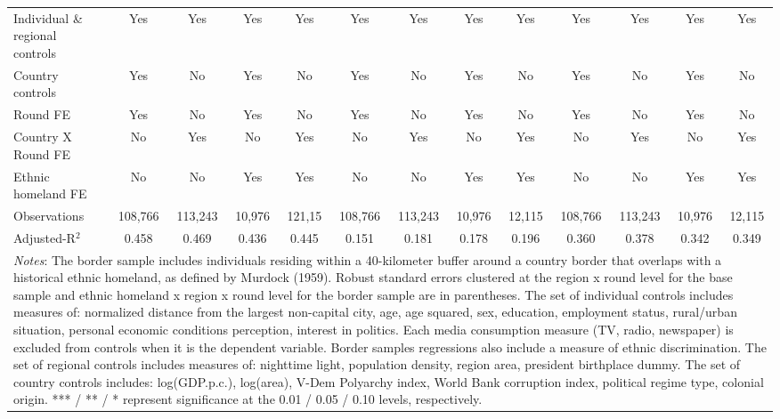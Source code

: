 \documentclass[11pt]{article}
\theoremstyle{plain}
\theoremstyle{plain}
\begin{document}
\begin{table}[H]
{\begin{tabular}{@{\extracolsep{5pt}} l c c c c c c c c c c c c}
        \midrule
             \smallskip
            Individual \& regional controls  & Yes & Yes & Yes & Yes  & Yes & Yes & Yes & Yes & Yes & Yes & Yes & Yes \\
            \smallskip
            Country controls & Yes& No& Yes& No& Yes& No& Yes& No& Yes& No& Yes& No\\
            \smallskip
            Round FE & Yes & No& Yes & No & Yes & No& Yes & No & Yes & No& Yes & No\\
            \smallskip
            Country X Round FE       & No & Yes& No & Yes& No & Yes& No & Yes& No & Yes& No & Yes\\
            \smallskip
            Ethnic homeland FE & No & No & Yes& Yes& No & No & Yes& Yes& No & No & Yes& Yes\\
            \smallskip
            Observations            &      108,766   &      113,243   &       10,976   &       121,15  &  108,766   &      113,243   &       10,976   &       12,115  &      108,766   &      113,243   &       10,976   &       12,115\\
            Adjusted-R$^2$         &   0.458   &       0.469   &       0.436   &       0.445 &       0.151   &       0.181   &       0.178   &       0.196 &       0.360   &       0.378   &       0.342   &       0.349  \\
                                  \bottomrule
            \multicolumn{13}{p{29cm}}{\footnotesize \emph{Notes}: The border sample includes individuals residing within a 40-kilometer buffer around a country border that overlaps with a historical ethnic homeland, as defined by Murdock (1959). Robust standard errors clustered at the region x round level  for the base sample and ethnic homeland x region x round level for the border sample are in parentheses. The set of individual controls
            includes measures of: normalized distance from the largest non-capital city, age, age squared, sex,
            education, employment status, rural/urban situation, personal economic conditions perception, interest in politics. Each media consumption measure (TV, radio, newspaper) is excluded from controls when it is the dependent variable. Border samples regressions also include a measure of ethnic discrimination. The set of regional controls includes measures of: nighttime light, population density, region area, president birthplace dummy. The set of country controls includes: log(GDP.p.c.), log(area), V-Dem Polyarchy index, World Bank corruption index, political regime type, colonial origin. *** / ** / * represent significance at the 0.01 / 0.05 / 0.10 levels, respectively.}
            \end{tabular}
            }
            \end{table}
 
\end{document}
